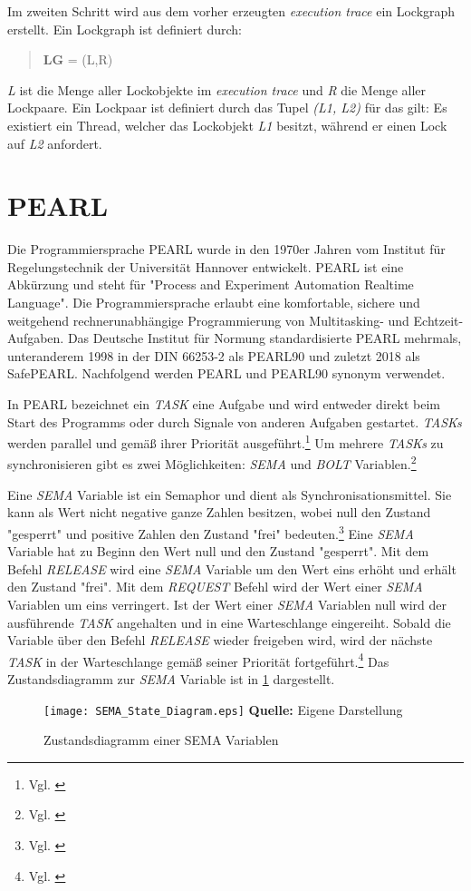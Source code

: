 Im zweiten Schritt wird aus dem vorher erzeugten \emph{execution trace} ein
Lockgraph erstellt. Ein Lockgraph ist definiert durch:
\begin{quote}
\textbf{LG} = (L,R)
\end{quote}
\emph{L} ist die Menge aller Lockobjekte im \emph{execution trace} und \emph{R}
die Menge aller Lockpaare. Ein Lockpaar ist definiert durch das Tupel \emph{(L1,
L2)} für das gilt: Es existiert ein Thread, welcher das Lockobjekt \emph{L1}
besitzt, während er einen Lock auf \emph{L2} anfordert.

\section{PEARL}
\label{section:PEARL}
Die Programmiersprache PEARL wurde in den 1970er Jahren vom Institut für
Regelungstechnik der Universität Hannover entwickelt\autocite{PEARLHistory}.
PEARL ist eine Abkürzung und steht für "Process and Experiment Automation
Realtime Language". Die Programmiersprache erlaubt eine komfortable, sichere und
weitgehend rechnerunabhängige Programmierung von Multitasking- und
Echtzeit-Aufgaben. Das Deutsche Institut für Normung standardisierte PEARL
mehrmals, unteranderem 1998 in der DIN 66253-2 als
PEARL90\autocite{DIN-66253-2:1998-04} und zuletzt 2018 als
SafePEARL\autocite{DIN-66253:2018-03}. Nachfolgend werden PEARL und PEARL90
synonym verwendet. 

In PEARL bezeichnet ein \emph{TASK} eine Aufgabe und wird entweder direkt beim
Start des Programms oder durch Signale von anderen Aufgaben gestartet.
\emph{TASKs} werden parallel und gemäß ihrer Priorität ausgeführt.\footnote{Vgl.
\autocite[104]{PEARL}} Um mehrere \emph{TASKs} zu synchronisieren gibt es zwei
Möglichkeiten: \emph{SEMA} und \emph{BOLT} Variablen.\footnote{Vgl.
\autocite[120]{PEARL}}

Eine \emph{SEMA} Variable ist ein Semaphor und dient als Synchronisationsmittel.
Sie kann als Wert nicht negative ganze Zahlen besitzen, wobei null den Zustand
"gesperrt" und positive Zahlen den Zustand "frei" bedeuten.\footnote{Vgl.
\autocite[120]{PEARL}} Eine \emph{SEMA} Variable hat zu Beginn den Wert null und
den Zustand "gesperrt". Mit dem Befehl \emph{RELEASE} wird eine \emph{SEMA}
Variable um den Wert eins erhöht und erhält den Zustand "frei". Mit dem
\emph{REQUEST} Befehl wird der Wert einer \emph{SEMA} Variablen um eins
verringert. Ist der Wert einer \emph{SEMA} Variablen null wird der ausführende
\emph{TASK} angehalten und in eine Warteschlange eingereiht. Sobald die Variable
über den Befehl \emph{RELEASE} wieder freigeben wird, wird der nächste
\emph{TASK} in der Warteschlange gemäß seiner Priorität
fortgeführt.\footnote{Vgl. \autocite[120-121]{PEARL}} Das Zustandsdiagramm zur
\emph{SEMA} Variable ist in \cref{fig:SEMA_StateDiagram} dargestellt.
\begin{figure}[ht]
  \texttt{[image: SEMA\_State\_Diagram.eps]}
  \footnotesize\sffamily\textbf{Quelle:} Eigene Darstellung
  \caption{Zustandsdiagramm einer SEMA Variablen}
  \label{fig:SEMA_StateDiagram}
\end{figure}

